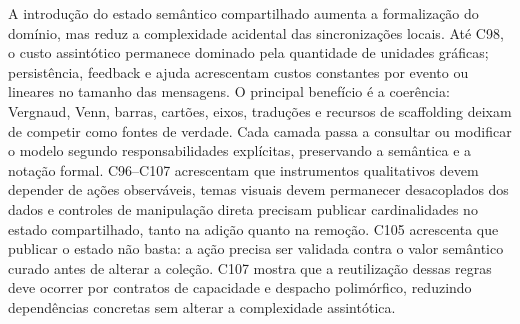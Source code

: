 \documentclass[12pt,a4paper]{article}
\begin{document}
A introdução do estado semântico compartilhado aumenta a formalização do domínio, mas reduz a complexidade acidental das sincronizações locais. Até C98, o custo assintótico permanece dominado pela quantidade de unidades gráficas; persistência, feedback e ajuda acrescentam custos constantes por evento ou lineares no tamanho das mensagens. O principal benefício é a coerência: Vergnaud, Venn, barras, cartões, eixos, traduções e recursos de scaffolding deixam de competir como fontes de verdade. Cada camada passa a consultar ou modificar o modelo segundo responsabilidades explícitas, preservando a semântica e a notação formal. C96--C107 acrescentam que instrumentos qualitativos devem depender de ações observáveis, temas visuais devem permanecer desacoplados dos dados e controles de manipulação direta precisam publicar cardinalidades no estado compartilhado, tanto na adição quanto na remoção. C105 acrescenta que publicar o estado não basta: a ação precisa ser validada contra o valor semântico curado antes de alterar a coleção. C107 mostra que a reutilização dessas regras deve ocorrer por contratos de capacidade e despacho polimórfico, reduzindo dependências concretas sem alterar a complexidade assintótica.
\end{document}
